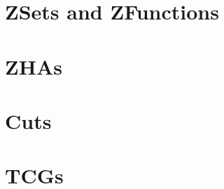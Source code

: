 \documentclass[oneside]{article}
\begin{document}
%

\section{ZSets and ZFunctions}


%                         

\section{ZHAs}



%                     

\section{Cuts}


%                      

\section{TCGs}
\end{document}
